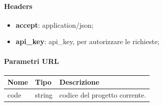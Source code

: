 \paragraph{Headers }
\begin{itemize}
    \item \textbf{accept}: application/json;
    \item \textbf{api\_key}: api\_key, per autorizzare le richieste;
\end{itemize}
\paragraph{Parametri URL} \hfill \break
\begin{center}
    \renewcommand{\arraystretch}{1.8}
    \begin{tabular}{ |m{10em}|m{4em}|m{20em}| }
        \hline
        \textbf{Nome} & \textbf{Tipo} & \textbf{Descrizione} \\
        \hline
        code & string & codice del progetto corrente.\\
        \hline
    \end{tabular}
\end{center}

